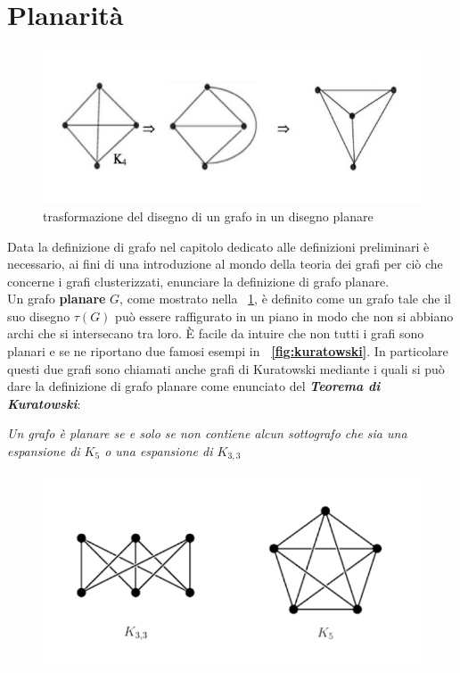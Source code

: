 \large{
\section{Planarità}
\begin{figure}[!htb]
	\begin{center}
		\includegraphics[width=1 \linewidth]{figure/planarita}
	\end{center}
	\caption{trasformazione del disegno di un grafo in un disegno planare \label{fig:planarita}}
\end{figure}
Data la definizione di grafo nel capitolo dedicato alle definizioni preliminari è necessario, ai fini di una introduzione al mondo della teoria dei grafi per ciò che concerne i grafi clusterizzati, enunciare la definizione di grafo planare.\\
Un grafo\textbf{ planare} $G$, come mostrato nella \figurename~\ref{fig:planarita}, è definito come un grafo tale che il suo disegno $\tau(G)$ può essere raffigurato in un piano in modo che non si abbiano archi che si intersecano tra loro. È facile da intuire che non tutti i grafi sono planari e se ne riportano due famosi esempi in \textbf{\figurename~\ref{fig:kuratowski}}. In particolare questi due grafi sono chiamati anche grafi di Kuratowski mediante i quali si può dare la definizione di grafo planare come enunciato del \textit{\textbf{Teorema di Kuratowski}}:
\begin{center}
	\textit{Un grafo è planare \textit{se e solo se} non contiene alcun sottografo che sia una espansione di $K_5 $ o una espansione di $K_{3,3}$\\}
\end{center}
\begin{figure}[!htb]
	\begin{center}
		\includegraphics[width=0.9 \linewidth]{figure/kuratowski}

\end{center}
\end{figure}}
